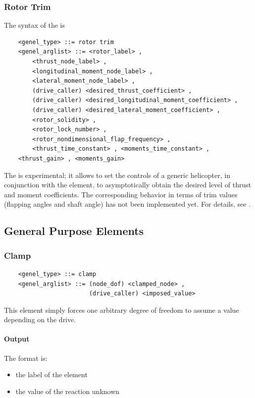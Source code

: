 \subsubsection{Rotor Trim}
The syntax of the  is
\begin{verbatim}
    <genel_type> ::= rotor trim
    <genel_arglist> ::= <rotor_label> ,
        <thrust_node_label> ,
        <longitudinal_moment_node_label> ,
        <lateral_moment_node_label> ,
        (drive_caller) <desired_thrust_coefficient> ,
        (drive_caller) <desired_longitudinal_moment_coefficient> ,
        (drive_caller) <desired_lateral_moment_coefficient> ,
        <rotor_solidity> ,
        <rotor_lock_number> ,
        <rotor_nondimensional_flap_frequency> ,
        <thrust_time_constant> , <moments_time_constant> ,
	<thrust_gain> , <moments_gain>
\end{verbatim}
The  is experimental; it allows to set the controls 
of a generic helicopter, in conjunction with the 
element, to asymptotically obtain the desired level of thrust and
moment coefficients.
The corresponding behavior in terms of trim values (flapping angles
and shaft angle) has not been implemented yet.
For details, see \cite{PETERS-TRIM90}.




\subsection{General Purpose Elements}
   
\subsubsection{Clamp}
\begin{verbatim}
    <genel_type> ::= clamp
    <genel_arglist> ::= (node_dof) <clamped_node> ,
                        (drive_caller) <imposed_value>
\end{verbatim}
This element simply forces one arbitrary degree of freedom to assume a value
depending on the drive.

\paragraph{Output}
The format is:
\begin{itemize}
    \item the label of the element
    \item the value of the reaction unknown
\end{itemize}
  
